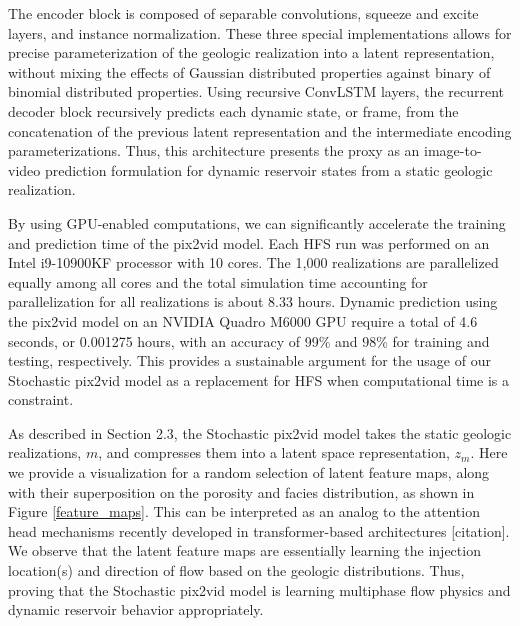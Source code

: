 \documentclass[10pt, twoside]{article}
\begin{document}
The encoder block is composed of separable convolutions, squeeze and excite layers, and instance normalization. These three special implementations allows for precise parameterization of the geologic realization into a latent representation, without mixing the effects of Gaussian distributed properties against binary of binomial distributed properties. Using recursive ConvLSTM layers, the recurrent decoder block recursively predicts each dynamic state, or frame, from the concatenation of the previous latent representation and the intermediate encoding parameterizations. Thus, this architecture presents the proxy as an image-to-video prediction formulation for dynamic reservoir states from a static geologic realization.

By using GPU-enabled computations, we can significantly accelerate the training and prediction time of the pix2vid model. Each HFS run was performed on an Intel \textregistered i9-10900KF processor with 10 cores. The 1,000 realizations are parallelized equally among all cores and the total simulation time accounting for parallelization for all realizations is about 8.33 hours. Dynamic prediction using the pix2vid model on an NVIDIA Quadro M6000 GPU require a total of 4.6 seconds, or 0.001275 hours, with an accuracy of 99\% and 98\% for training and testing, respectively. This provides a sustainable argument for the usage of our Stochastic pix2vid model as a replacement for HFS when computational time is a constraint.

As described in Section 2.3, the Stochastic pix2vid model takes the static geologic realizations, $m$, and compresses them into a latent space representation, $z_m$. Here we provide a visualization for a random selection of latent feature maps, along with their superposition on the porosity and facies distribution, as shown in Figure \ref{feature_maps}. This can be interpreted as an analog to the attention head mechanisms recently developed in transformer-based architectures [citation]. We observe that the latent feature maps are essentially learning the injection location(s) and direction of flow based on the geologic distributions. Thus, proving that the Stochastic pix2vid model is learning multiphase flow physics and dynamic reservoir behavior appropriately.
\end{document}
